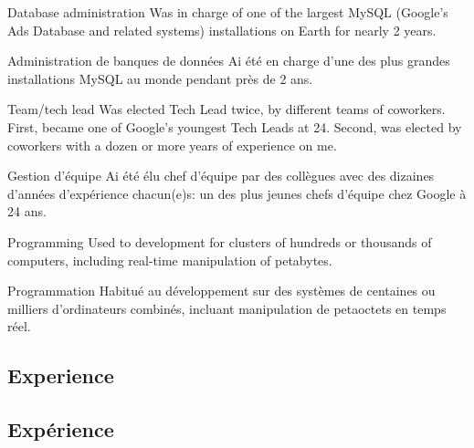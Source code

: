 \begin{description}

\begin{langen}
\item[Database administration] Was in charge of one of the largest MySQL (Google's Ads Database and related systems) installations on Earth for nearly 2 years.
\end{langen}
\begin{langfr}
\item[Administration de banques de donn\'{e}es] Ai \'{e}t\'{e} en charge d'une des plus grandes installations MySQL au monde pendant pr\`{e}s de 2 ans.
\end{langfr}

\vspace{2 mm}

\begin{langen}
\item[Team/tech lead] Was elected Tech Lead twice, by different teams of coworkers. First, became one of Google's youngest Tech Leads at 24. Second, was elected by coworkers with a dozen or more years of experience on me.
\end{langen}
\begin{langfr}
\item[Gestion d'\'{e}quipe] Ai \'{e}t\'{e} \'{e}lu chef d'\'{e}quipe par des coll\`{e}gues avec des dizaines d'ann\'{e}es d'exp\'{e}rience chacun(e)s: un des plus jeunes chefs d'\'{e}quipe chez Google \`{a} 24 ans.
\end{langfr}

\vspace{2 mm}

\begin{langen}
\item[Programming] Used to development for clusters of hundreds or thousands of computers, including real-time manipulation of petabytes.
\end{langen}
\begin{langfr}
\item[Programmation] Habitu\'{e} au d\'{e}veloppement sur des syst\`{e}mes de centaines ou milliers d'ordinateurs combin\'{e}s, incluant manipulation de petaoctets en temps r\'{e}el.
\end{langfr}

\end{description}

\begin{langen}
\section{Experience}
\end{langen}
\begin{langfr}
\section{Exp\'{e}rience}
\end{langfr}

